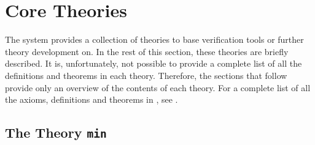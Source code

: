 \chapter{Core Theories}\label{HOLtheories}

%



\setcounter{sessioncount}{0}


\newcommand{\konst}[1]{\ensuremath{\mbox{\small{\textbf{\sf{#1}}}}}}
\newcommand{\nil}{\mathbf{[} \;\mathbf{]}}
\newcommand{\cons}[2]{{#1}\mathbf{:}\mathbf{:}{#2}}

 The \HOL{} system provides a collection of theories to base
verification tools or further theory development on.  In the rest of
this section, these theories are briefly described.  It is,
unfortunately, not possible to provide a complete list of all the
definitions and theorems in each theory. Therefore, the sections that
follow provide only an overview of the contents of each theory.  For a
complete list of all the axioms, definitions and theorems in \HOL, see
\REFERENCE.

\section{The Theory {\tt min}}\label{minTheory}

